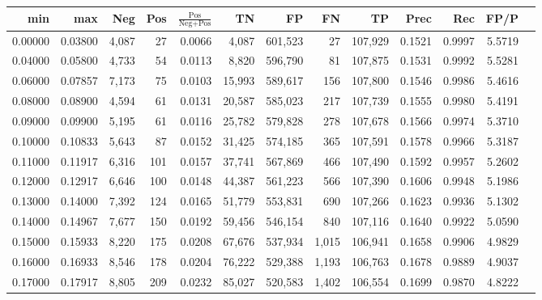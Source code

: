 \begin{tabular}{rrrrrrrrrrrrr}
\toprule
    min &     max &    Neg &   Pos & $\frac{\text{Pos}}{\text{Neg}+\text{Pos}}$ &      TN &      FP &      FN &      TP &   Prec &    Rec &   FP/P \\
\midrule
0.00000 & 0.03800 &  4,087 &    27 &                                     0.0066 &   4,087 & 601,523 &      27 & 107,929 & 0.1521 & 0.9997 & 5.5719 \\
0.04000 & 0.05800 &  4,733 &    54 &                                     0.0113 &   8,820 & 596,790 &      81 & 107,875 & 0.1531 & 0.9992 & 5.5281 \\
0.06000 & 0.07857 &  7,173 &    75 &                                     0.0103 &  15,993 & 589,617 &     156 & 107,800 & 0.1546 & 0.9986 & 5.4616 \\
0.08000 & 0.08900 &  4,594 &    61 &                                     0.0131 &  20,587 & 585,023 &     217 & 107,739 & 0.1555 & 0.9980 & 5.4191 \\
0.09000 & 0.09900 &  5,195 &    61 &                                     0.0116 &  25,782 & 579,828 &     278 & 107,678 & 0.1566 & 0.9974 & 5.3710 \\
0.10000 & 0.10833 &  5,643 &    87 &                                     0.0152 &  31,425 & 574,185 &     365 & 107,591 & 0.1578 & 0.9966 & 5.3187 \\
0.11000 & 0.11917 &  6,316 &   101 &                                     0.0157 &  37,741 & 567,869 &     466 & 107,490 & 0.1592 & 0.9957 & 5.2602 \\
0.12000 & 0.12917 &  6,646 &   100 &                                     0.0148 &  44,387 & 561,223 &     566 & 107,390 & 0.1606 & 0.9948 & 5.1986 \\
0.13000 & 0.14000 &  7,392 &   124 &                                     0.0165 &  51,779 & 553,831 &     690 & 107,266 & 0.1623 & 0.9936 & 5.1302 \\
0.14000 & 0.14967 &  7,677 &   150 &                                     0.0192 &  59,456 & 546,154 &     840 & 107,116 & 0.1640 & 0.9922 & 5.0590 \\
0.15000 & 0.15933 &  8,220 &   175 &                                     0.0208 &  67,676 & 537,934 &   1,015 & 106,941 & 0.1658 & 0.9906 & 4.9829 \\
0.16000 & 0.16933 &  8,546 &   178 &                                     0.0204 &  76,222 & 529,388 &   1,193 & 106,763 & 0.1678 & 0.9889 & 4.9037 \\
0.17000 & 0.17917 &  8,805 &   209 &                                     0.0232 &  85,027 & 520,583 &   1,402 & 106,554 & 0.1699 & 0.9870 & 4.8222 \\

\end{tabular}
